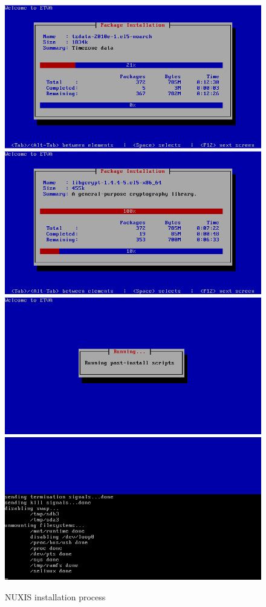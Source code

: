 \begin{figure}[H]
\begin{center}
    \includegraphics[scale=0.4]{screenshots/install_etva6.png}        
    \includegraphics[scale=0.4]{screenshots/install_etva8.png}
    \includegraphics[scale=0.4]{screenshots/install_etva9.png}
    \includegraphics[scale=0.4]{screenshots/install_etva10.png}
\caption{NUXIS installation process}
	\label{fig:installation_standard}
	\end{center}
\end{figure}

